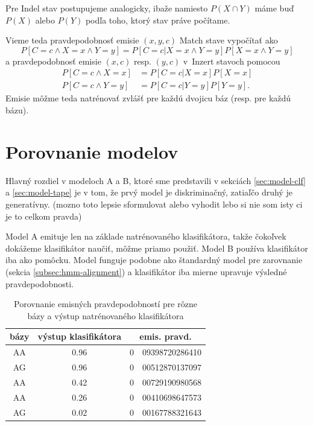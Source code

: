 Pre Indel stav postupujeme analogicky, ibaže namiesto $P(X \cap Y)$ máme buď $P(X)$ alebo $P(Y)$ podľa toho, ktorý stav práve počítame.

Vieme teda pravdepodobnosť emisie $(x, y, c)$ Match stave vypočítať ako $$P\left[C=c \wedge X=x \wedge Y=y\right] = P\left[C=c | X=x \wedge Y=y\right] P\left[X=x \wedge Y=y\right]$$ a pravdepodobnosť emisie $(x, c)$ resp. $(y, c)$  v~Inzert stavoch pomocou
\begin{align*}
P\left[C=c \wedge X=x\right] &= P\left[C=c | X=x\right] P\left[X=x\right]\\
P\left[C=c \wedge Y=y\right] &= P\left[C=c | Y=y\right] P\left[Y=y\right].
\end{align*}
Emisie môžme teda natrénovať zvlášť pre každú dvojicu báz (resp. pre každú bázu).


\section{Porovnanie modelov}
\label{sec:cmp-model}
Hlavný rozdiel v modeloch A a B, ktoré sme predstavili v sekciách \ref{sec:model-clf} a \ref{sec:model-tape} je v tom, že prvý model je diskriminačný, zatiaľčo druhý je generatívny. (\todo mozno toto lepsie sformulovat alebo vyhodit lebo si nie som isty ci je to celkom pravda)

Model A emituje len na základe natrénovaného klasifikátora, takže čokoľvek dokážeme klasifikátor naučiť, môžme priamo použiť. Model B používa klasifikátor iba ako pomôcku. Model funguje podobne ako štandardný model pre zarovnanie (sekcia \ref{subsec:hmm-alignment}) a klasifikátor iba mierne upravuje výsledné pravdepodobnosti.

\begin{table}
\centering
\begin{tabular}{cc|r@{,}l}
bázy & výstup klasifikátora & \multicolumn{2}{c}{emis. pravd.}\\
\hline
AA & 0.96 & 0 & 09398720286410\\
AG & 0.96 & 0 & 00512870137097\\
AA & 0.42 & 0 & 00729190980568\\
AA & 0.26 & 0 & 00410698647573\\
AG & 0.02 & 0 & 00167788321643\\
\end{tabular}
\caption[Porovnanie emisných pravdepodobností]{Porovnanie emisných pravdepodobností pre rôzne bázy a výstup natrénovaného klasifikátora}
\label{tab:emission-prob}
\end{table}

